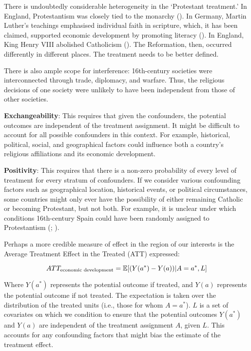 \documentclass[
  single column]{article}
\begin{document}
There is undoubtedly considerable heterogeneity in the `Protestant
treatment.' In England, Protestantism was closely tied to the monarchy
(). In Germany, Martin
Luther's teachings emphasised individual faith in scripture, which, it
has been claimed, supported economic development by promoting literacy
(). In England,
King Henry VIII abolished Catholicism
(). The Reformation, then,
occurred differently in different places. The treatment needs to be
better defined.

There is also ample scope for interference: 16th-century societies were
interconnected through trade, diplomacy, and warfare. Thus, the
religious decisions of one society were unlikely to have been
independent from those of other societies.

\textbf{Exchangeability}: This requires that given the confounders, the
potential outcomes are independent of the treatment assignment. It might
be difficult to account for all possible confounders in this context.
For example, historical, political, social, and geographical factors
could influence both a country's religious affiliations and its economic
development.

\textbf{Positivity}: This requires that there is a non-zero probability
of every level of treatment for every stratum of confounders. If we
consider various confounding factors such as geographical location,
historical events, or political circumstances, some countries might only
ever have the possibility of either remaining Catholic or becoming
Protestant, but not both. For example, it is unclear under which
conditions 16th-century Spain could have been randomly assigned to
Protestantism (;
).

Perhaps a more credible measure of effect in the region of our interests
is the Average Treatment Effect in the Treated (ATT) expressed:

\[
ATT_{\textnormal{economic~development}} = \mathbb{E}[(Y(a^*) - Y(a))|A = a^*,L]
\]

Where \(Y(a^*)\) represents the potential outcome if treated, and
\(Y(a)\) represents the potential outcome if not treated. The
expectation is taken over the distribution of the treated units (i.e.,
those for whom \(A = a^*\)). \(L\) is a set of covariates on which we
condition to ensure that the potential outcomes \(Y(a^*)\) and \(Y(a)\)
are independent of the treatment assignment \(A\), given \(L\). This
accounts for any confounding factors that might bias the estimate of the
treatment effect.
\end{document}

